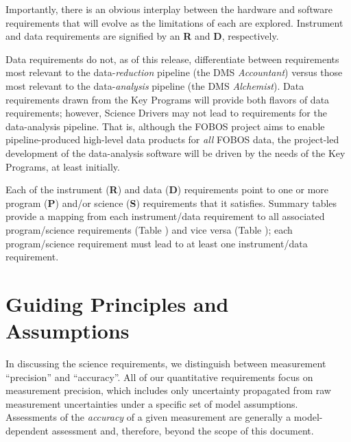 \documentclass[11pt,a4paper,twoside,onecolumn,openany,final,oldfontcommands]{memoir}
\begin{document}

Importantly, there is an obvious interplay between the hardware and software requirements that will evolve as the limitations of each are explored. Instrument and data requirements are signified by an \textbf{R} and \textbf{D}, respectively.

Data requirements do not, as of this release, differentiate between requirements most relevant to the data-\textit{reduction} pipeline (the DMS \textit{Accountant}) versus those most relevant to the data-\textit{analysis} pipeline (the DMS \textit{Alchemist}).  Data requirements drawn from the Key Programs will provide both flavors of data requirements; however, Science Drivers may not lead to requirements for the data-analysis pipeline.  That is, although the FOBOS project aims to enable pipeline-produced high-level data products for \textit{all} FOBOS data, the project-led development of the data-analysis software will be driven by the needs of the Key Programs, at least initially.

Each of the instrument (\textbf{R}) and data (\textbf{D}) requirements point to one or more program (\textbf{P}) and/or science (\textbf{S}) requirements that it satisfies.  Summary tables provide a mapping from each instrument/data requirement to all associated program/science requirements (Table ) and vice versa (Table ); each program/science requirement must lead to at least one instrument/data requirement.

\section{Guiding Principles and Assumptions}

In discussing the science requirements, we distinguish between measurement ``precision'' and ``accuracy''. All of our quantitative requirements focus on measurement precision, which includes only uncertainty propagated from raw measurement uncertainties under a specific set of model assumptions. Assessments of the \textit{accuracy} of a given measurement are generally a model-dependent assessment and, therefore, beyond the scope of this document.
\end{document}
